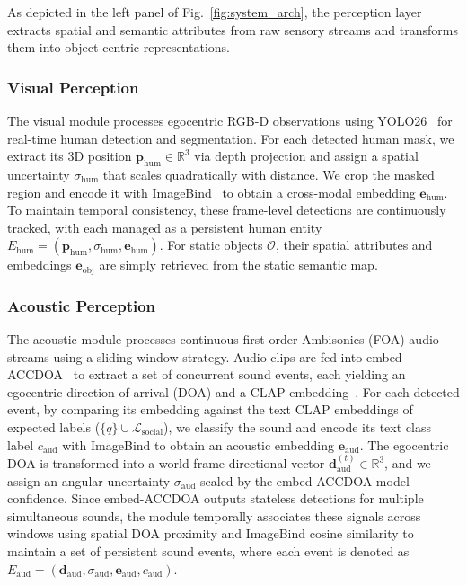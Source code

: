 As depicted in the left panel of Fig.~\ref{fig:system_arch}, the perception layer extracts spatial and semantic attributes from raw sensory streams and transforms them into object-centric representations.

\subsubsection{Visual Perception}
The visual module processes egocentric RGB-D observations using YOLO26~\cite{YOLO26KeyArchitectural2026} for real-time human detection and segmentation. For each detected human mask, we extract its 3D position $\mathbf{p}_{\mathrm{hum}} \in \mathbb{R}^3$ via depth projection and assign a spatial uncertainty $\sigma_{\mathrm{hum}}$ that scales quadratically with distance. We crop the masked region and encode it with ImageBind~\cite{ImageBindOneEmbedding2023} to obtain a cross-modal embedding $\mathbf{e}_{\mathrm{hum}}$. To maintain temporal consistency, these frame-level detections are continuously tracked, with each managed as a persistent human entity $E_{\mathrm{hum}} = (\mathbf{p}_{\mathrm{hum}}, \sigma_{\mathrm{hum}}, \mathbf{e}_{\mathrm{hum}})$. For static objects $\mathcal{O}$, their spatial attributes and embeddings $\mathbf{e}_{\mathrm{obj}}$ are simply retrieved from the static semantic map.

\subsubsection{Acoustic Perception}
The acoustic module processes continuous first-order Ambisonics (FOA) audio streams using a sliding-window strategy. Audio clips are fed into embed-ACCDOA~\cite{OpenvocabularySoundEvent2025} to extract a set of concurrent sound events, each yielding an egocentric direction-of-arrival (DOA) and a CLAP embedding~\cite{CLAPLearningAudio2023}. For each detected event, by comparing its embedding against the text CLAP embeddings of expected labels ($\{q\} \cup \mathcal{L}_{\mathrm{social}}$), we classify the sound and encode its text class label $c_{\mathrm{aud}}$ with ImageBind to obtain an acoustic embedding $\mathbf{e}_{\mathrm{aud}}$. The egocentric DOA is transformed into a world-frame directional vector $\mathbf{d}_{\mathrm{aud}}^{(t)} \in \mathbb{R}^3$, and we assign an angular uncertainty $\sigma_{\mathrm{aud}}$ scaled by the embed-ACCDOA model confidence. Since embed-ACCDOA outputs stateless detections for multiple simultaneous sounds, the module temporally associates these signals across windows using spatial DOA proximity and ImageBind cosine similarity to maintain a set of persistent sound events, where each event is denoted as $E_{\mathrm{aud}} = (\mathbf{d}_{\mathrm{aud}}, \sigma_{\mathrm{aud}}, \mathbf{e}_{\mathrm{aud}}, c_{\mathrm{aud}})$.

